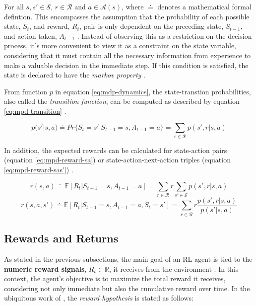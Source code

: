 For all $s, s' \in \mathcal{S}$, $r \in \mathcal{R}$ and $a \in \mathcal{A}(s)$, where $\doteq$ denotes a mathematical formal defintion. This encompasses the assumption that the probability of each possible state, $S_t$, and reward, $R_t$, pair is only dependent on the preceding state, $S_{t-1}$, and action taken, $A_{t-1}$ \cite{suttonReinforcementLearningIntroduction2014}. Instead of observing this as a restriction on the decision process, it's more convenient to view it as a constraint on the state variable, considering that it must contain all the necessary information from experience to make a valuable decision in the immediate step. If this condition is satisfied, the state is declared to have the \textit{markov property} \cite{suttonReinforcementLearningIntroduction2014}. \par
From function $p$ in equation \ref{eq:mdp-dynamics}, the state-transtion probabilities, also called the \textit{transition function}, can be computed as described by equation \ref{eq:mpd-transition} \cite{suttonReinforcementLearningIntroduction2014, moralesGrokkingDeepReinforcement2020}.

\begin{equation} \label{eq:mpd-transition}
	p(s'|s,a) \doteq Pr\{S_t = s'|S_{t-1} = s, A_{t-1} = a\} = \sum_{r \in \mathcal{R}} p(s',r|s,a)
\end{equation}

In addition, the expected rewards can be calculated for state-action pairs (equation \ref{eq:mpd-reward-sa}) or state-action-next-action triples (equation \ref{eq:mpd-reward-sas'}) \cite{suttonReinforcementLearningIntroduction2014, moralesGrokkingDeepReinforcement2020}.

\begin{equation} \label{eq:mpd-reward-sa}
	r(s,a) \doteq \mathbb{E}[R_t | S_{t-1} = s, A_{t-1} = a] = \sum_{r \in \mathcal{R}} r \sum_{s' \in \mathcal{S}} p(s', r|s,a)
\end{equation}
\begin{equation} \label{eq:mpd-reward-sas'}
	r(s,a,s') \doteq \mathbb{E}[R_t | S_{t-1} = s, A_{t-1} = a, S_t = s'] = \sum_{r \in \mathcal{R}} r \frac{p(s',r|s,a)}{p(s'|s,a)}
\end{equation}

\subsection{Rewards and Returns}

As stated in the previous subsections, the main goal of an \ac{RL} agent is tied to the \textbf{numeric reward signals}, $R_t \in \mathbb{R}$, it receives from the environment \cite{suttonReinforcementLearningIntroduction2014}. In this context, the agent's objective is to maximize the total reward it receives, considering not only immediate but also the cumulative reward over time. In the ubiquitous work of \cite{suttonReinforcementLearningIntroduction2014}, the \textit{reward hypothesis} is stated as follows:

